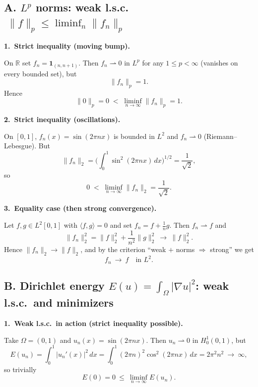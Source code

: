 \documentclass[12pt,a4paper]{article}
\theoremstyle{plain}
\theoremstyle{definition}
\theoremstyle{remark}
\theoremstyle{remark}
\theoremstyle{definition}
\begin{document}
	\clearpage
	
\subsection*{A. $L^p$ norms: weak l.s.c.\ $\;\|f\|_{p}\le \liminf_{n}\|f_n\|_{p}$}

\noindent\textbf{1.\ Strict inequality (moving bump).}\par
\noindent
On $\mathbb{R}$ set $f_n=\mathbf 1_{(n,n+1)}$. Then $f_n\rightharpoonup 0$ in $L^p$ for any $1\le p<\infty$
(vanishes on every bounded set), but
\[
\|f_n\|_{p}=1.
\]
Hence
\[
\|0\|_{p}=0 \;<\; \liminf_{n\to\infty}\|f_n\|_{p}=1.
\]

\medskip
\noindent\textbf{2.\ Strict inequality (oscillations).}\par
\noindent
On $[0,1]$, $f_n(x)=\sin(2\pi n x)$ is bounded in $L^2$ and $f_n\rightharpoonup 0$ (Riemann–Lebesgue).
But
\[
\|f_n\|_{2}=\Big(\int_0^1 \sin^2(2\pi n x)\,dx\Big)^{1/2}=\frac{1}{\sqrt{2}},
\]
so
\[
0 \;<\; \liminf_{n\to\infty}\|f_n\|_{2}=\frac{1}{\sqrt{2}}.
\]

\medskip
\noindent\textbf{3.\ Equality case (then strong convergence).}\par
\noindent
Let $f,g\in L^2[0,1]$ with $\langle f,g\rangle=0$ and set $f_n=f+\tfrac{1}{n}g$.
Then $f_n\rightharpoonup f$ and
\[
\|f_n\|_{2}^{2}=\|f\|_{2}^{2}+\frac{1}{n^{2}}\|g\|_{2}^{2}\ \longrightarrow\ \|f\|_{2}^{2}.
\]
Hence $\|f_n\|_{2}\to\|f\|_{2}$, and by the criterion ``weak $+$ norms $\Rightarrow$ strong'' we get
\[
f_n\ \to\ f \quad\text{in }L^2.
\]

\vspace{1em}

\subsection*{B. Dirichlet energy $E(u)=\displaystyle\int_{\Omega} |\nabla u|^{2}$: weak l.s.c.\ and minimizers}

\noindent\textbf{1.\ Weak l.s.c.\ in action (strict inequality possible).}\par
\noindent
Take $\Omega=(0,1)$ and $u_n(x)=\sin(2\pi n x)$. Then $u_n\rightharpoonup 0$ in $H^1_0(0,1)$, but
\[
E(u_n)=\int_0^1 |u_n'(x)|^2\,dx=\int_0^1 (2\pi n)^2\cos^2(2\pi n x)\,dx
=2\pi^{2}n^{2}\ \longrightarrow\ \infty,
\]
so trivially
\[
E(0)=0\ \le\ \liminf_{n\to\infty} E(u_n).
\]
\end{document}
